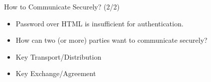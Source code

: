 \documentclass[notes,xcolor=dvipsnames]{beamer}
\begin{document}
\begin{frame}{How to Communicate Securely? (2/2)}

\begin{itemize}
	\item Password over HTML is insufficient for authentication.
	\item How can two (or more) parties want to communicate securely?
\end{itemize}
	

  \pause
	\vspace*{2em}
	\begin{itemize}
		\item Key Transport/Distribution
		\item<1-| alert@2> Key Exchange/Agreement
	\end{itemize}
\end{frame}
	
\end{document}

